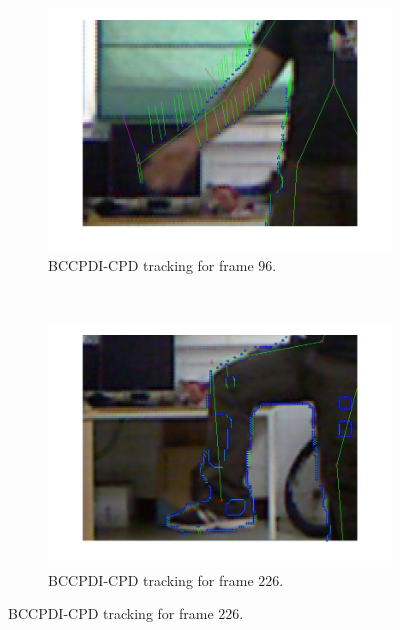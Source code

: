 \begin{figure}[t]
        \centering

        \begin{subfigure}[b]{0.45\textwidth}
                \centering
                \includegraphics[width=\textwidth, trim=0 0 0 0,clip]{fig30.jpg}
                \caption{BCCPDI-CPD tracking for frame $96$.}
                \label{fig:cp02_comparison_oflow_fails_elbow_cpd_side}
        \end{subfigure}%
	~
        \begin{subfigure}[b]{0.45\textwidth}
                \centering
                \includegraphics[width=\textwidth, trim=0 0 0 0,clip]{fig31.jpg}
                \caption{BCCPDI-CPD tracking for frame $226$.}
                \label{fig:cp02_comparison_oflow_fails_knee_cpd_side}
        \end{subfigure}%


\end{figure}

